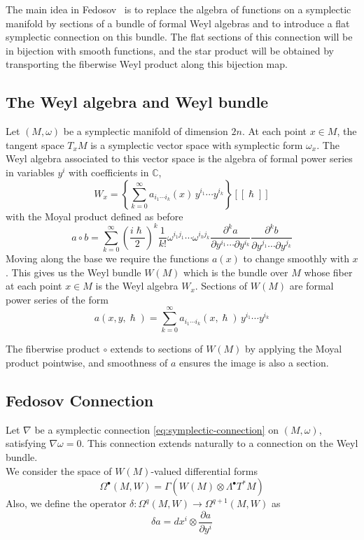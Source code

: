 \documentclass[
  12pt,
  a4paper, oneside
]{report}
\renewcommand{\hbar}{\hslash}
\theoremstyle{bolddef}
\theoremstyle{remark}
\numberwithin{equation}{chapter}
\begin{document}
The main idea in Fedosov~\cite{Fedosov1994} is to replace the
algebra of functions on a symplectic manifold by sections of a bundle of formal Weyl algebras and to introduce a flat symplectic connection on this bundle. The flat sections of this connection will be in bijection with smooth functions, and the star product will be obtained by transporting the fiberwise Weyl product along this bijection map.

\subsection*{The Weyl algebra and Weyl bundle}

Let $(M,\omega)$ be a symplectic manifold of dimension $2n$. At each
point $x\in M$, the tangent space $T_xM$ is a symplectic vector space
with symplectic form $\omega_x$. The Weyl algebra associated to this
vector space is the algebra of formal power series in variables
$y^i$ with coefficients in $\mathbb{C}$,
\[
W_x = \left\{
\sum_{k=0}^\infty a_{i_1\cdots i_k}(x)\,y^{i_1}\cdots y^{i_k}
\right\}[[\hbar]]
\]
with the Moyal product defined as before
\[
a\circ b
=
\sum_{k=0}^{\infty}
\left(\frac{i\hbar}{2}\right)^k
\frac{1}{k!}
\omega^{i_1 j_1}\cdots \omega^{i_k j_k}
\frac{\partial^k a}{\partial y^{i_1}\cdots\partial y^{i_k}}
\frac{\partial^k b}{\partial y^{j_1}\cdots\partial y^{j_k}}
\]
Moving along the base we require the functions $a(x)$ to change smoothly with $x$. This gives us the Weyl bundle $W(M)$ which is the bundle over $M$ whose fiber at each point
$x\in M$ is the Weyl algebra $W_x$. Sections of $W(M)$ are formal power
series of the form
\[
a(x,y,\hbar)
=
\sum_{k=0}^{\infty}
a_{i_1\cdots i_k}(x,\hbar)
\,y^{i_1}\cdots y^{i_k}
\]

The fiberwise product $\circ$ extends to sections of $W(M)$ by applying the Moyal product pointwise, and smoothness of $a$ ensures the image is also a section.

\subsection*{Fedosov Connection}

Let $\nabla$ be a symplectic connection \eqref{eq:symplectic-connection} on $(M,\omega)$, satisfying $\nabla \omega = 0$. This connection extends naturally to a connection on the Weyl bundle. \\
We consider the space of $W(M)$-valued
differential forms
\[
\Omega^\bullet(M,W) = \Gamma(W(M)\otimes \Lambda^\bullet T^*M)
\]
Also, we define the operator $\delta : \Omega^q(M,W) \to \Omega^{q+1}(M,W)$ as
\[
\delta a = dx^i \otimes \frac{\partial a}{\partial y^i}
\]
\end{document}
